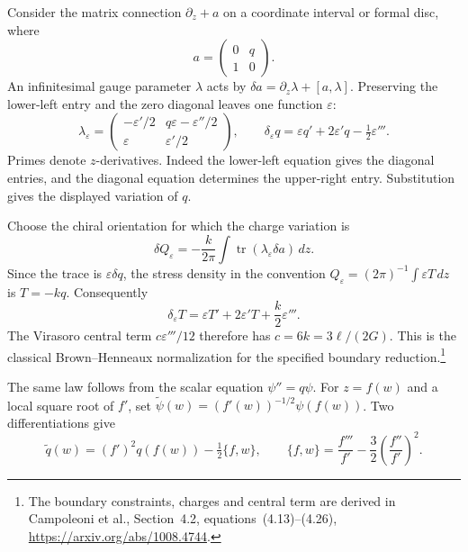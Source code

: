 Consider the matrix connection $\partial_z+a$ on a coordinate
interval or formal disc, where
\[
 a=\begin{pmatrix}0&q\\1&0\end{pmatrix}.
\]
An infinitesimal gauge parameter $\lambda$ acts by
$\delta a=\partial_z\lambda+[a,\lambda]$.
Preserving the lower-left entry and the zero diagonal leaves one
function $\varepsilon$:
\begin{equation}\label{mht:eq:gravity-ds-parameter}
 \lambda_\varepsilon=
 \begin{pmatrix}
  -\varepsilon'/2&q\varepsilon-\varepsilon''/2\\
  \varepsilon&\varepsilon'/2
 \end{pmatrix},
 \qquad
 \delta_\varepsilon q
 =\varepsilon q'+2\varepsilon'q-\tfrac12\varepsilon'''.
\end{equation}
Primes denote $z$-derivatives.
Indeed the lower-left equation gives the diagonal entries, and
the diagonal equation determines the upper-right entry.
Substitution gives the displayed variation of $q$.

Choose the chiral orientation for which the charge variation is
\[
 \delta Q_\varepsilon
   =-\frac{k}{2\pi}\int\operatorname{tr}
                       (\lambda_\varepsilon\delta a)\,dz.
\]
Since the trace is $\varepsilon\delta q$, the stress density
in the convention $Q_\varepsilon=(2\pi)^{-1}\int\varepsilon T\,dz$
is $T=-kq$. Consequently
\begin{equation}\label{mht:eq:gravity-classical-stress}
 \delta_\varepsilon T
 =\varepsilon T'+2\varepsilon'T+\frac{k}{2}\varepsilon'''.
\end{equation}
The Virasoro central term $c\varepsilon'''/12$ therefore has
$c=6k=3\ell/(2G)$.
This is the classical Brown--Henneaux normalization for the
specified boundary reduction.\footnote{The boundary constraints,
charges and central term are derived in Campoleoni et al.,
Section~4.2, equations~(4.13)--(4.26),
\url{https://arxiv.org/abs/1008.4744}.}

The same law follows from the scalar equation $\psi''=q\psi$.
For $z=f(w)$ and a local square root of $f'$, set
$\widetilde\psi(w)=(f'(w))^{-1/2}\psi(f(w))$.
Two differentiations give
\begin{equation}\label{mht:eq:gravity-projective-change}
 \widetilde q(w)=(f')^2q(f(w))-\tfrac12\{f,w\},
 \qquad
 \{f,w\}=\frac{f'''}{f'}-\frac32\left(\frac{f''}{f'}\right)^2.
\end{equation}

